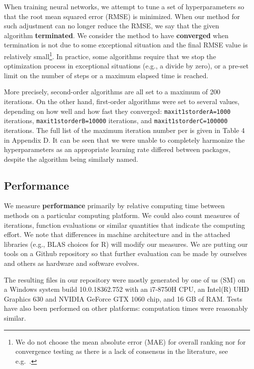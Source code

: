 When training neural networks, we attempt to tune a set of
hyperparameters so that the root mean squared error (RMSE) is minimized.
When our method for such adjustment can no longer reduce the RMSE, we
say that the given algorithm \textbf{terminated}. We consider the method
to have \textbf{converged} when termination is not due to some
exceptional situation and the final RMSE value is relatively
small\footnote{We do not choose the mean absolute error (MAE) for
  overall ranking nor for convergence testing as there is a lack of
  consensus in the literature, see
  e.g.~\citep{willmott2005advantages,chai2014root}.}. In practice, some
algorithms require that we stop the optimization process in exceptional
situations (e.g., a divide by zero), or a pre-set limit on the number of
steps or a maximum elapsed time is reached.

More precisely, second-order algorithms are all set to a maximum of 200
iterations. On the other hand, first-order algorithms were set to
several values, depending on how well and how fast they converged:
\texttt{maxit1storderA=1000} iterations, \texttt{maxit1storderB=10000}
iterations, and \texttt{maxit1storderC=100000} iterations. The full list
of the maximum iteration number per  is given in
Table 4 in Appendix D. It can be seen that we were unable to completely
harmonize the hyperparameters as an appropriate learning rate differed
between packages, despite the algorithm being similarly named.

\hypertarget{performance}{%
\subsection{Performance}\label{performance}}

We measure \textbf{performance} primarily by relative computing time
between methods on a particular computing platform. We could also count
measures of iterations, function evaluations or similar quantities that
indicate the computing effort. We note that differences in machine
architecture and in the attached libraries (e.g., BLAS choices for
\textsf{R}) will modify our measures. We are putting our tools on a
Github repository so that further evaluation can be made by ourselves
and others as hardware and software evolves.

The resulting files in our repository were mostly generated by one of us
(SM) on a Windows system build 10.0.18362.752 with an i7-8750H CPU, an
Intel(R) UHD Graphics 630 and NVIDIA GeForce GTX 1060 chip, and 16 GB of
RAM. Tests have also been performed on other platforms: computation
times were reasonably similar.

